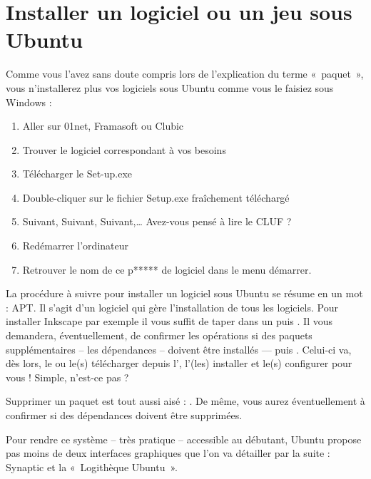 {\section{Installer un logiciel ou un jeu sous Ubuntu}
\label{RefInstallApp}
Comme vous l'avez sans doute compris lors de l'explication du terme «~paquet~», vous n'installerez plus vos logiciels sous Ubuntu comme vous le faisiez sous Windows :\par
\begin{enumerate}
\item Aller sur 01net, Framasoft ou Clubic
\item Trouver le logiciel correspondant à vos besoins
\item Télécharger le Set-up.exe
\item Double-cliquer sur le fichier Setup.exe fraîchement téléchargé
\item Suivant, Suivant, Suivant,\ldots{} Avez-vous pensé à lire le CLUF ?
\item Redémarrer l'ordinateur
\item Retrouver le nom de ce p***** de logiciel dans le menu démarrer.
\end{enumerate}
La procédure à suivre pour installer un logiciel sous Ubuntu se résume en un mot : APT. Il s'agit d'un logiciel qui gère l'installation de tous les logiciels. Pour installer Inkscape par exemple il vous suffit de taper  dans un  puis . Il vous demandera, éventuellement, de confirmer les opérations si des paquets supplémentaires -- les dépendances -- doivent être installés ---  puis . Celui-ci va, dès lors, le ou le(s) télécharger depuis l', l'(les) installer et le(s) configurer pour vous ! Simple, n'est-ce pas ?\par
Supprimer un paquet est tout aussi aisé :  . De même, vous aurez éventuellement à confirmer si des dépendances doivent être supprimées.\par
Pour rendre ce système -- très pratique -- accessible au débutant, Ubuntu propose pas moins de deux interfaces graphiques que l'on va détailler par la suite : Synaptic et la «~Logithèque Ubuntu~».
}
